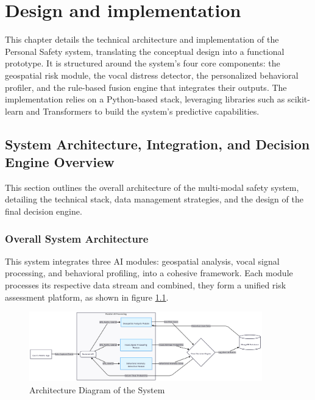 \documentclass[12pt,a4paper,oneside,english]{book}
\begin{document}


\chapter{Design and implementation}
\label{ch:4eme}
This chapter details the technical architecture and implementation of the Personal Safety system, translating the conceptual design into a functional prototype. 
It is structured around the system's four core components: the geospatial risk module, the vocal distress detector, the personalized behavioral profiler, and the rule-based fusion engine that integrates their outputs. 
The implementation relies on a Python-based stack, leveraging libraries such as scikit-learn and Transformers to build the system's predictive capabilities.

\section{System Architecture, Integration, and Decision Engine Overview}
\label{sec:system_architecture}
This section outlines the overall architecture of the multi-modal safety system, detailing the technical stack, data management strategies, and the design of the final decision engine.
\subsection{Overall System Architecture}
This system integrates three AI modules: geospatial analysis, vocal signal processing, and behavioral profiling, into a cohesive framework. 
Each module processes its respective data stream and combined, they form a unified risk assessment platform, as shown in figure \ref{fig:architecture}.
\begin{figure}[h!] %
    \centering
    \includegraphics[width=0.9\textwidth]{images/diag5.png}
    \caption{Architecture Diagram of the System}
    \label{fig:architecture}
\end{figure}
\end{document}
